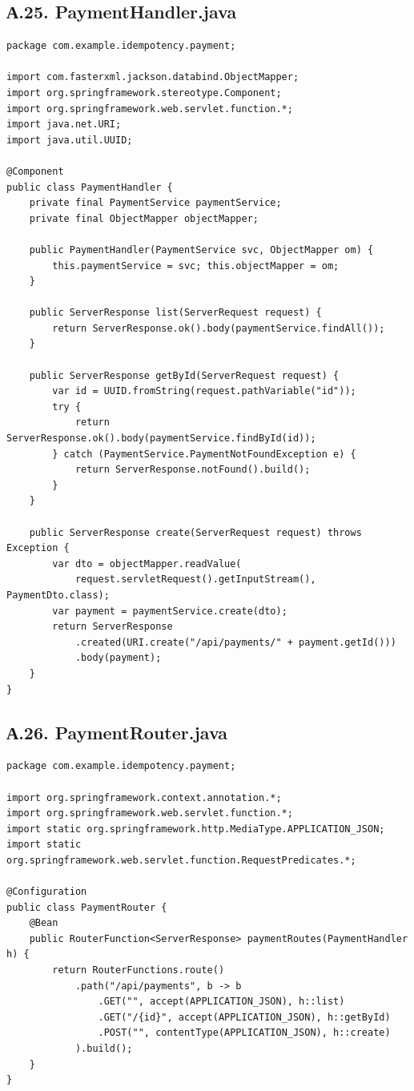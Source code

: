 \subsection*{А.25. PaymentHandler.java}
\begin{lstlisting}[caption={PaymentHandler.java --- тип контроллера \textnumero 2: HandlerFunction}]
package com.example.idempotency.payment;

import com.fasterxml.jackson.databind.ObjectMapper;
import org.springframework.stereotype.Component;
import org.springframework.web.servlet.function.*;
import java.net.URI;
import java.util.UUID;

@Component
public class PaymentHandler {
    private final PaymentService paymentService;
    private final ObjectMapper objectMapper;

    public PaymentHandler(PaymentService svc, ObjectMapper om) {
        this.paymentService = svc; this.objectMapper = om;
    }

    public ServerResponse list(ServerRequest request) {
        return ServerResponse.ok().body(paymentService.findAll());
    }

    public ServerResponse getById(ServerRequest request) {
        var id = UUID.fromString(request.pathVariable("id"));
        try {
            return ServerResponse.ok().body(paymentService.findById(id));
        } catch (PaymentService.PaymentNotFoundException e) {
            return ServerResponse.notFound().build();
        }
    }

    public ServerResponse create(ServerRequest request) throws Exception {
        var dto = objectMapper.readValue(
            request.servletRequest().getInputStream(), PaymentDto.class);
        var payment = paymentService.create(dto);
        return ServerResponse
            .created(URI.create("/api/payments/" + payment.getId()))
            .body(payment);
    }
}
\end{lstlisting}

\subsection*{А.26. PaymentRouter.java}
\begin{lstlisting}[caption={PaymentRouter.java --- тип контроллера \textnumero 2: RouterFunction}]
package com.example.idempotency.payment;

import org.springframework.context.annotation.*;
import org.springframework.web.servlet.function.*;
import static org.springframework.http.MediaType.APPLICATION_JSON;
import static org.springframework.web.servlet.function.RequestPredicates.*;

@Configuration
public class PaymentRouter {
    @Bean
    public RouterFunction<ServerResponse> paymentRoutes(PaymentHandler h) {
        return RouterFunctions.route()
            .path("/api/payments", b -> b
                .GET("", accept(APPLICATION_JSON), h::list)
                .GET("/{id}", accept(APPLICATION_JSON), h::getById)
                .POST("", contentType(APPLICATION_JSON), h::create)
            ).build();
    }
}
\end{lstlisting}


